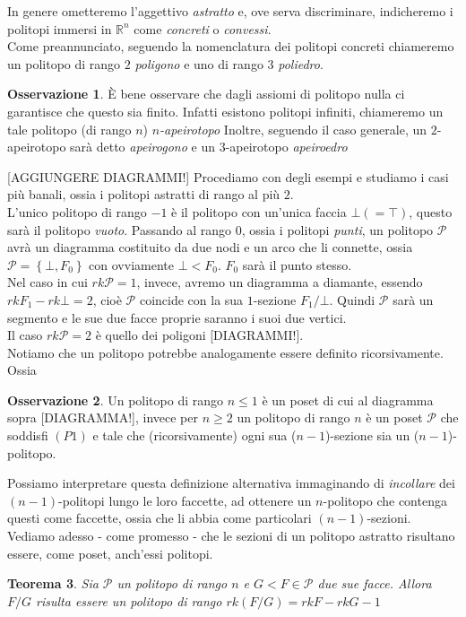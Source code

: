 \documentclass[a4paper,12pt]{report}
\newcommand{\Rn}{\mathbb{R}^n}
\newcommand{\p}{\mathcal{P}}
\theoremstyle{plain}
\newtheorem{teo}{Teorema}[chapter]
\theoremstyle{definition}
\newtheorem{oss}[teo]{Osservazione}
\begin{document}
In genere ometteremo l'aggettivo \emph{astratto} e, ove serva discriminare, indicheremo i politopi immersi in $\Rn$ come \emph{concreti} o
\emph{convessi}.\\
Come preannunciato, seguendo la nomenclatura dei politopi concreti chiameremo un politopo di rango $2$ \emph{poligono} e uno di rango $3$
\emph{poliedro}.
\begin{oss}
\`E bene osservare che dagli assiomi di politopo nulla ci garantisce che questo sia finito. Infatti esistono politopi infiniti, chiameremo un tale
politopo (di rango $n$) \emph{$n$-apeirotopo}
Inoltre, seguendo il caso generale, un $2$-apeirotopo sar\`a detto \emph{apeirogono} e un $3$-apeirotopo \emph{apeiroedro}
\end{oss}
[AGGIUNGERE DIAGRAMMI!]
Procediamo con degli esempi e studiamo i casi pi\`u banali, ossia i politopi astratti di rango al pi\`u $2$.\\
L'unico politopo di rango $-1$ \`e il politopo con un'unica faccia $\bot(=\top)$, questo sar\`a il politopo \emph{vuoto}.
Passando al rango $0$, ossia i politopi \emph{punti}, un politopo $\p$ avr\`a un diagramma costituito
da due nodi e un arco che li connette, ossia $\p=\left\{\bot,F_0\right\}$ con ovviamente $\bot<F_0$. $F_0$ sar\`a il punto stesso.\\
Nel caso in cui $rk\p=1$, invece, avremo un diagramma a diamante, essendo $rkF_1-rk\bot=2$, cio\`e $\p$ coincide con la sua 
$1$-sezione $F_1/\bot$. Quindi $\p$ sar\`a un segmento e le sue due facce proprie saranno i suoi due vertici.\\
Il caso $rk\p=2$ \`e quello dei poligoni [DIAGRAMMI!].	\\
Notiamo che un politopo potrebbe analogamente essere definito ricorsivamente. Ossia
\begin{oss}
Un politopo di rango $n\leq 1$ \`e un poset di cui al diagramma sopra [DIAGRAMMA!], invece per $n\geq 2$ un politopo di rango $n$ \`e un poset $\p$ che
soddisfi $(P1)$ e tale che (ricorsivamente) ogni sua ($n-1$)-sezione sia un ($n-1$)-politopo.
\end{oss}
Possiamo interpretare questa definizione alternativa immaginando di \emph{incollare} dei $(n-1)$-politopi lungo le loro faccette, ad ottenere un
$n$-politopo che contenga questi come faccette, ossia che li abbia come particolari $(n-1)$-sezioni.\\
Vediamo adesso - come promesso - che le sezioni di un politopo astratto risultano essere, come poset, anch'essi politopi.
\begin{teo}
\label{teo:SectionIsPoly}
Sia $\p$ un politopo di rango $n$ e $G<F\in\p$ due sue facce. Allora $F/G$ risulta essere un politopo di rango $rk(F/G)=rkF-rkG-1$
\end{teo}
\end{document}
